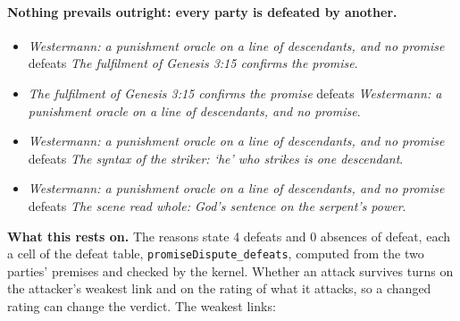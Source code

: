 \documentclass[11pt]{article}
\begin{document}
\paragraph{Nothing prevails outright: every party is defeated by another.}
\begin{itemize}
\item \emph{Westermann: a punishment oracle on a line of descendants, and no promise} defeats \emph{The fulfilment of Genesis 3:15 confirms the promise}.
\item \emph{The fulfilment of Genesis 3:15 confirms the promise} defeats \emph{Westermann: a punishment oracle on a line of descendants, and no promise}.
\item \emph{Westermann: a punishment oracle on a line of descendants, and no promise} defeats \emph{The syntax of the striker: ‘he’ who strikes is one descendant}.
\item \emph{Westermann: a punishment oracle on a line of descendants, and no promise} defeats \emph{The scene read whole: God’s sentence on the serpent’s power}.
\end{itemize}
\par\noindent\textbf{What this rests on.} The reasons state 4 defeats and 0 absences of defeat, each a cell of the defeat table, \texttt{promise\allowbreak{}Dispute\_\allowbreak{}defeats}, computed from the two parties' premises and checked by the kernel. Whether an attack survives turns on the attacker's weakest link and on the rating of what it attacks, so a changed rating can change the verdict. The weakest links:
\end{document}
